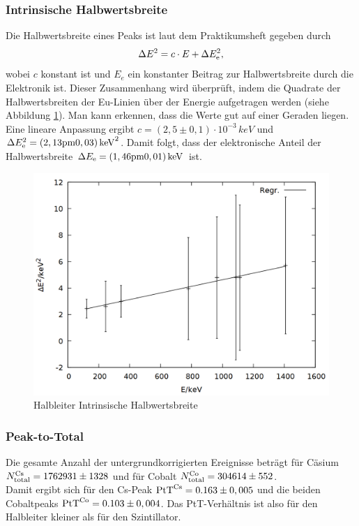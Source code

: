 \subsubsection*{Intrinsische Halbwertsbreite}
Die Halbwertsbreite eines Peaks ist laut dem Praktikumsheft \cite{praktikumsheft} gegeben durch
\begin{align*}
\Delta E^2 = c \cdot E + \Delta E\ind{e}^2,
\end{align*}
wobei $c$ konstant ist und $E_e$ ein konstanter Beitrag zur Halbwertsbreite durch die Elektronik ist.
Dieser Zusammenhang wird überprüft, indem die Quadrate der Halbwertsbreiten der Eu-Linien über der Energie aufgetragen werden (siehe Abbildung \ref{fig:ge_intrinsic}). Man kann erkennen, dass die Werte gut auf einer Geraden liegen. Eine lineare Anpassung ergibt $c = \si{(2,5 \pm 0,1)\cdot 10^{-3}\,keV}$ und $\Delta E\ind{e}^2 = \si{(2,13 \pm 0,03)\,keV^2}$. Damit folgt, dass der elektronische Anteil der Halbwertsbreite $\Delta E\ind{e} = \si{(1,46 \pm 0,01)\,keV}$ ist.

\begin{figure}
\centering
\includegraphics[width=0.7\linewidth]{data/ge_intrinsic.png}
\caption{Halbleiter Intrinsische Halbwertsbreite}
\label{fig:ge_intrinsic}
\end{figure}


\subsubsection*{Peak-to-Total}
Die gesamte Anzahl der untergrundkorrigierten Ereignisse beträgt für Cäsium $N\ind{total}\upd{Cs} = 1762931 \pm 1328$ und für Cobalt $N\ind{total}\upd{Co} = 304614\pm 552$.\\
Damit ergibt sich für den Cs-Peak $\text{PtT}\upd{Cs} = 0.163\pm 0,005$ und die beiden Cobaltpeaks $\text{PtT}\upd{Co} = 0.103\pm 0,004$. Das PtT-Verhältnis ist also für den Halbleiter kleiner als für den Szintillator.

